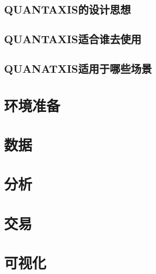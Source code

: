 \documentclass{scrartcl}
\numberwithin{equation}{section}
\begin{document}
\subsection{QUANTAXIS的设计思想}

\subsection{QUANTAXIS适合谁去使用}

\subsection{QUANATXIS适用于哪些场景}

\newpage
\section{环境准备}

\newpage
\section{数据}

\newpage
\section{分析}
\newpage
\section{交易}
\newpage
\section{可视化}
\newpage
\end{document}
